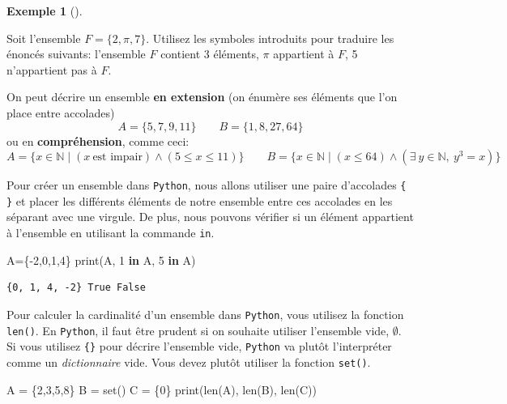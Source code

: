 \documentclass[
  letterpaper,
]{scrbook}
\newenvironment{Shaded}{}{}
\newcommand{\BuiltInTok}[1]{#1}
\newcommand{\DecValTok}[1]{\textcolor[rgb]{0.25,0.63,0.44}{#1}}
\newcommand{\KeywordTok}[1]{\textcolor[rgb]{0.00,0.44,0.13}{\textbf{#1}}}
\newcommand{\NormalTok}[1]{#1}
\newcommand{\OperatorTok}[1]{\textcolor[rgb]{0.40,0.40,0.40}{#1}}
\newcommand{\set}[1]{\{#1\}}
\theoremstyle{plain}
\theoremstyle{definition}
\newtheorem{example}{Exemple}[chapter]
\theoremstyle{definition}
\theoremstyle{remark}
\begin{document}
\leavevmode{}%
\begin{example}[]\label{exm-ensemble-simple}

Soit l'ensemble \(F=\set{2,\pi,7}\). Utilisez les symboles introduits
pour traduire les énoncés suivants: l'ensemble \(F\) contient 3
éléments, \(\pi\) appartient à \(F\), 5 n'appartient pas à \(F\).

\end{example}

On peut décrire un ensemble \textbf{en extension} (on énumère ses
éléments que l'on place entre accolades) \[
A=\set{5,7,9,11} \qquad B=\set{1,8,27,64}
\] ou en \textbf{compréhension}, comme ceci: \[
A=\set{x\in\mathbb{N}\mid (x\ \text{est impair}) \wedge (5\leq x \leq 11)} \qquad
B=\set{x\in\mathbb{N}\mid (x \leq 64) \wedge (\exists\ y\in \mathbb{N},\ y^3=x)}
\]

Pour créer un ensemble dans \texttt{Python}, nous allons utiliser une
paire d'accolades \texttt{\{} \texttt{\}} et placer les différents
éléments de notre ensemble entre ces accolades en les séparant avec une
virgule. De plus, nous pouvons vérifier si un élément appartient à
l'ensemble en utilisant la commande \texttt{in}.

\hypertarget{ensemble-accolades}{}
\begin{Shaded}
\begin{Highlighting}[]
\NormalTok{A}\OperatorTok{=}\NormalTok{\{}\OperatorTok{{-}}\DecValTok{2}\NormalTok{,}\DecValTok{0}\NormalTok{,}\DecValTok{1}\NormalTok{,}\DecValTok{4}\NormalTok{\}}
\BuiltInTok{print}\NormalTok{(A, }\DecValTok{1} \KeywordTok{in}\NormalTok{ A, }\DecValTok{5} \KeywordTok{in}\NormalTok{ A)}
\end{Highlighting}
\end{Shaded}

\begin{verbatim}
{0, 1, 4, -2} True False
\end{verbatim}

Pour calculer la cardinalité d'un ensemble dans \texttt{Python}, vous
utilisez la fonction \texttt{len()}. En \texttt{Python}, il faut être
prudent si on souhaite utiliser l'ensemble vide, \(\emptyset\). Si vous
utilisez \texttt{\{\}} pour décrire l'ensemble vide, \texttt{Python} va
plutôt l'interpréter comme un \emph{dictionnaire} vide. Vous devez
plutôt utiliser la fonction \texttt{set()}.

\hypertarget{cardinalite-python}{}
\begin{Shaded}
\begin{Highlighting}[]
\NormalTok{A }\OperatorTok{=}\NormalTok{ \{}\DecValTok{2}\NormalTok{,}\DecValTok{3}\NormalTok{,}\DecValTok{5}\NormalTok{,}\DecValTok{8}\NormalTok{\}}
\NormalTok{B }\OperatorTok{=} \BuiltInTok{set}\NormalTok{()}
\NormalTok{C }\OperatorTok{=}\NormalTok{ \{}\DecValTok{0}\NormalTok{\}}
\BuiltInTok{print}\NormalTok{(}\BuiltInTok{len}\NormalTok{(A), }\BuiltInTok{len}\NormalTok{(B), }\BuiltInTok{len}\NormalTok{(C))}
\end{Highlighting}
\end{Shaded}
\end{document}
